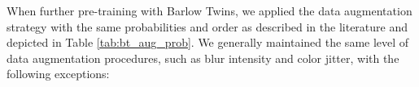\documentclass[a4paper,fleqn]{cas-dc}
\begin{document}

When further pre-training with Barlow Twins, we applied the data augmentation strategy with the same probabilities and order as described in the literature \cite{zbontar2021barlow,grill2020bootstrap} and depicted in Table \ref{tab:bt_aug_prob}. We generally maintained the same level of data augmentation procedures, such as blur intensity and color jitter, with the following exceptions:
\end{document}
